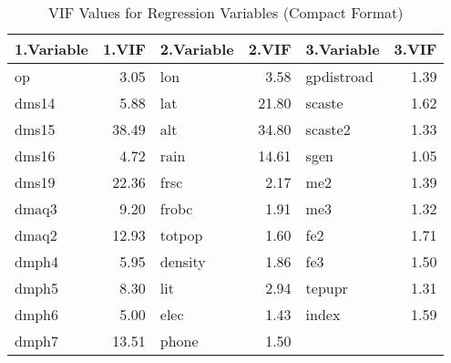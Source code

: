 \begin{table}[ht]
\centering
\begin{tabular}{lrlrlr}
  \hline
1.Variable & 1.VIF & 2.Variable & 2.VIF & 3.Variable & 3.VIF \\ 
  \hline
op & 3.05 & lon & 3.58 & gpdistroad & 1.39 \\ 
  dms14 & 5.88 & lat & 21.80 & scaste & 1.62 \\ 
  dms15 & 38.49 & alt & 34.80 & scaste2 & 1.33 \\ 
  dms16 & 4.72 & rain & 14.61 & sgen & 1.05 \\ 
  dms19 & 22.36 & frsc & 2.17 & me2 & 1.39 \\ 
  dmaq3 & 9.20 & frobc & 1.91 & me3 & 1.32 \\ 
  dmaq2 & 12.93 & totpop & 1.60 & fe2 & 1.71 \\ 
  dmph4 & 5.95 & density & 1.86 & fe3 & 1.50 \\ 
  dmph5 & 8.30 & lit & 2.94 & tepupr & 1.31 \\ 
  dmph6 & 5.00 & elec & 1.43 & index & 1.59 \\ 
  dmph7 & 13.51 & phone & 1.50 &  &  \\ 
   \hline
\end{tabular}
\caption{VIF Values for Regression Variables (Compact Format)} 
\label{tab:vif_values_compact}
\end{table}
